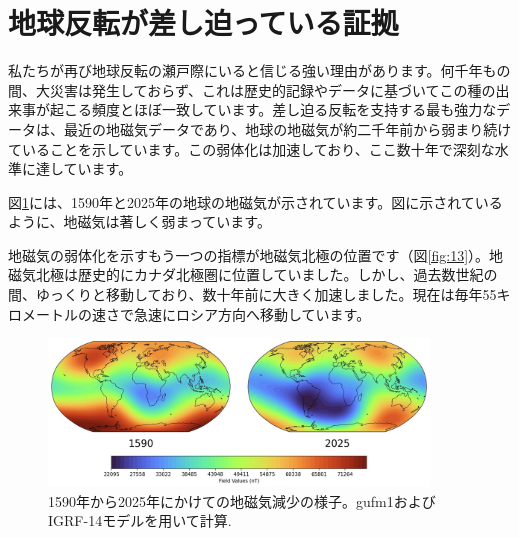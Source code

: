 \documentclass[10pt,twocolumn,letterpaper]{article}
\begin{document}
\section{地球反転が差し迫っている証拠}

私たちが再び地球反転の瀬戸際にいると信じる強い理由があります。何千年もの間、大災害は発生しておらず、これは歴史的記録やデータに基づいてこの種の出来事が起こる頻度とほぼ一致しています。差し迫る反転を支持する最も強力なデータは、最近の地磁気データであり、地球の地磁気が約二千年前から弱まり続けていることを示しています。この弱体化は加速しており、ここ数十年で深刻な水準に達しています。

図\ref{fig:14}には、1590年と2025年の地球の地磁気が示されています\cite{125,126}。図に示されているように、地磁気は著しく弱まっています。

地磁気の弱体化を示すもう一つの指標が地磁気北極の位置です（図\ref{fig:13}）。地磁気北極は歴史的にカナダ北極圏に位置していました。しかし、過去数世紀の間、ゆっくりと移動しており、数十年前に大きく加速しました。現在は毎年55キロメートルの速さで急速にロシア方向へ移動しています\cite{124}。

\begin{figure}[t]
\begin{center}
\includegraphics[width=0.9\textwidth]{saa.jpg}
\end{center}
   \caption{1590年から2025年にかけての地磁気減少の様子。gufm1およびIGRF-14モデルを用いて計算\cite{125,126}.}
\label{fig:14}
\end{figure}
\end{document}
